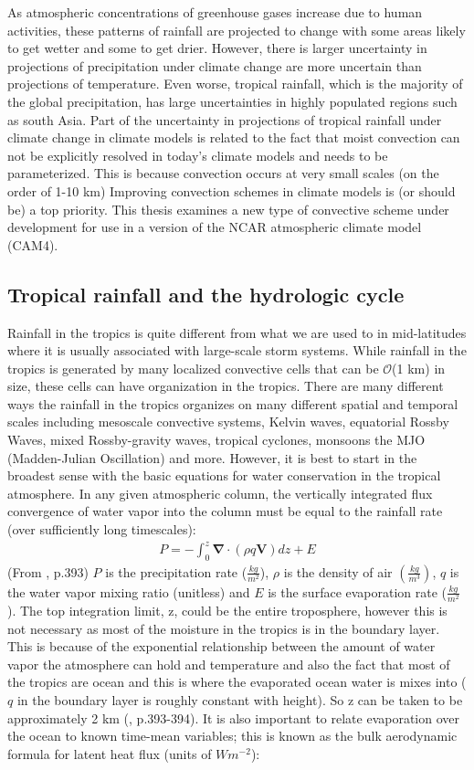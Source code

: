 \documentclass[letterpaper,12pt,titlepage,oneside,final]{book}
\begin{document}
As atmospheric concentrations of greenhouse gases increase due to human activities, these patterns of rainfall are projected to change with some areas likely to get wetter and some to get drier. However, there is larger uncertainty in projections of precipitation under climate change are more uncertain than projections of temperature. Even worse, tropical rainfall, which is the majority of the global precipitation, has large uncertainties in highly populated regions such as south Asia. Part of the uncertainty in projections of tropical rainfall under climate change in climate models is related to the fact that moist convection can not be explicitly resolved in today's climate models and needs to be parameterized. This is because convection occurs at very small scales (on the order of 1-10 km) Improving convection schemes in climate models is (or should be) a top priority. This thesis examines a new type of convective scheme under development for use in a version of the NCAR atmospheric climate model (CAM4).
\subsection{Tropical rainfall and the hydrologic cycle}
Rainfall in the tropics is quite different from what we are used to in mid-latitudes where it is usually associated with large-scale storm systems. While rainfall in the tropics is generated by many localized convective cells that can be $\mathcal{O}$(1 km) in size, these cells can have organization in the tropics. There are many different ways the rainfall in the tropics organizes on many different spatial and temporal scales including mesoscale convective systems, Kelvin waves, equatorial Rossby Waves, mixed Rossby-gravity waves, tropical cyclones, monsoons the MJO (Madden-Julian Oscillation) and more. However, it is best to start in the broadest sense with the basic equations for water conservation in the tropical atmosphere. In any given atmospheric column, the vertically integrated flux convergence of water vapor into the column must be equal to the rainfall rate (over sufficiently long timescales):
\begin{align}
P=-\int_{0}^{z}\mathbf{\nabla}\cdot(\rho{q}\mathbf{V})dz+E
\end{align}
(From \cite{holton_introduction_2004}, p.393)
$P$ is the precipitation rate ($\frac{kg}{m^{2}}$), $\rho$ is the density of air $(\frac{kg}{m^{3}})$, $q$ is the water vapor mixing ratio (unitless) and $E$ is the surface evaporation rate ($\frac{kg}{m^{2}}$). The top integration limit, z, could be the entire troposphere, however this is not necessary as most of the moisture in the tropics is in the boundary layer. This is because of the exponential relationship between the amount of water vapor the atmosphere can hold and temperature and also the fact that most of the tropics are ocean and this is where the evaporated ocean water is mixes into ($q$ in the boundary layer is roughly constant with height). So z can be taken to be approximately 2 km (\cite{holton_introduction_2004}, p.393-394). It is also important to relate evaporation over the ocean to known time-mean variables; this is known as the bulk aerodynamic formula for latent heat flux (units of $W m^{-2}$):
\end{document}
